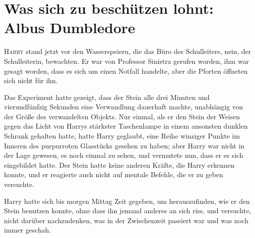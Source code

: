\chapter{Was sich zu beschützen lohnt: Albus Dumbledore}

\lettrine{H}{arry} stand jetzt vor den Wasserspeiern, die das Büro des Schulleiters, nein, der Schulleiterin, bewachten. Er war von Professor Sinistra gerufen worden, ihm war gesagt worden, dass es sich um einen Notfall handelte, aber die Pforten öffneten sich nicht für ihn.

Das Experiment hatte gezeigt, dass der Stein alle drei Minuten und vierundfünfzig Sekunden eine Verwandlung dauerhaft machte, unabhängig von der Größe des verwandelten Objekts. Nur einmal, als er den Stein der Weisen gegen das Licht von Harrys stärkster Taschenlampe in einem ansonsten dunklen Schrank gehalten hatte, hatte Harry geglaubt, eine Reihe winziger Punkte im Inneren des purpurroten Glasstücks gesehen zu haben; aber Harry war nicht in der Lage gewesen, es noch einmal zu sehen, und vermutete nun, dass er es sich eingebildet hatte. Der Stein hatte keine anderen Kräfte, die Harry erkennen konnte, und er reagierte auch nicht auf mentale Befehle, die er zu geben versuchte.

Harry hatte sich bis morgen Mittag Zeit gegeben, um herauszufinden, wie er den Stein benutzen konnte, ohne dass ihn jemand anderes an sich riss, und versuchte, nicht darüber nachzudenken, was in der Zwischenzeit passiert war und was noch immer geschah.

